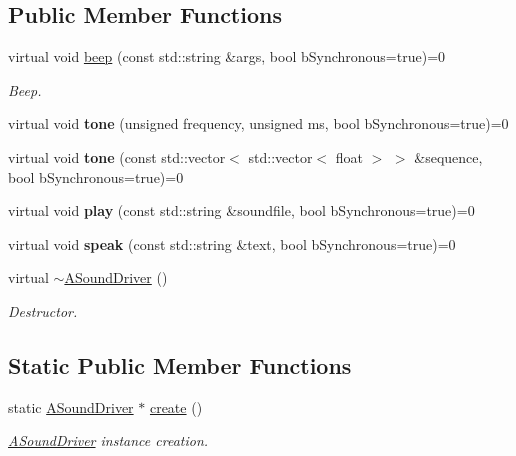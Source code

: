 \subsection*{Public Member Functions}
\begin{DoxyCompactItemize}
\item 
\mbox{\label{classASoundDriver_a65461d3d3b39c52dd038bfd5f696c25f}} 
virtual void \hyperlink{classASoundDriver_a65461d3d3b39c52dd038bfd5f696c25f}{beep} (const std\+::string \&args, bool b\+Synchronous=true)=0
\begin{DoxyCompactList}\small\item\em Beep. \end{DoxyCompactList}\item 
\mbox{\label{classASoundDriver_ad0c7a1f3ccf20e9a92e981d03ae84b80}} 
virtual void {\bfseries tone} (unsigned frequency, unsigned ms, bool b\+Synchronous=true)=0
\item 
\mbox{\label{classASoundDriver_a3e12c9b0ac4ea72b90b0b4ef500b2802}} 
virtual void {\bfseries tone} (const std\+::vector$<$ std\+::vector$<$ float $>$ $>$ \&sequence, bool b\+Synchronous=true)=0
\item 
\mbox{\label{classASoundDriver_a3e8ac55c3df292bd278001c1b628d1d7}} 
virtual void {\bfseries play} (const std\+::string \&soundfile, bool b\+Synchronous=true)=0
\item 
\mbox{\label{classASoundDriver_af6b99213f89da6e6c4cbffa09f2d29a8}} 
virtual void {\bfseries speak} (const std\+::string \&text, bool b\+Synchronous=true)=0
\item 
\mbox{\label{classASoundDriver_abdb81b386c26ffe1f4443f8fd6c1a435}} 
virtual \hyperlink{classASoundDriver_abdb81b386c26ffe1f4443f8fd6c1a435}{$\sim$\+A\+Sound\+Driver} ()
\begin{DoxyCompactList}\small\item\em Destructor. \end{DoxyCompactList}\end{DoxyCompactItemize}
\subsection*{Static Public Member Functions}
\begin{DoxyCompactItemize}
\item 
\mbox{\label{classASoundDriver_ac943c874b6d8dab9ec75b3178547560a}} 
static \hyperlink{classASoundDriver}{A\+Sound\+Driver} $\ast$ \hyperlink{classASoundDriver_ac943c874b6d8dab9ec75b3178547560a}{create} ()
\begin{DoxyCompactList}\small\item\em \hyperlink{classASoundDriver}{A\+Sound\+Driver} instance creation. \end{DoxyCompactList}\end{DoxyCompactItemize}
